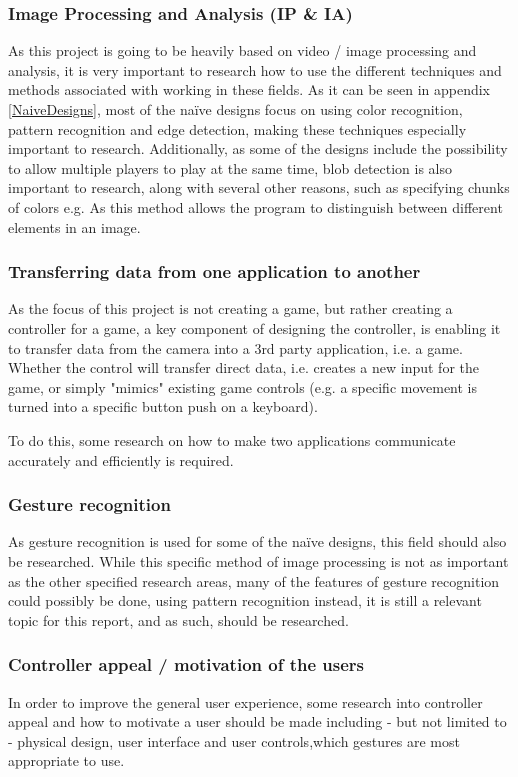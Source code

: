 \subsubsection{Image Processing and Analysis (IP \& IA)}
As this project is going to be heavily based on video / image processing and analysis, it is very important to research how to use the different techniques and methods associated with working in these fields. As it can be seen in appendix \ref{NaiveDesigns}, most of the naïve designs focus on using color recognition, pattern recognition and edge detection, making these techniques especially important to research. Additionally, as some of the designs include the possibility to allow multiple players to play at the same time, blob detection is also important to research, along with several other reasons, such as specifying chunks of colors e.g. As this method allows the program to distinguish between different elements in an image.

\subsubsection{Transferring data from one application to another}
As the focus of this project is not creating a game, but rather creating a controller for a game, a key component of designing the controller, is enabling it to transfer data from the camera into a 3rd party application, i.e. a game. Whether the control will transfer direct data, i.e. creates a new input for the game, or simply "mimics" existing game controls (e.g. a specific movement is turned into a specific button push on a keyboard).

To do this, some research on how to make two applications communicate accurately and efficiently is required.

\subsubsection{Gesture recognition}
As gesture recognition is used for some of the naïve designs, this field should also be researched. While this specific method of image processing is not as important as the other specified research areas, many of the features of gesture recognition could possibly be done, using pattern recognition instead, it is still a relevant topic for this report, and as such, should be researched.

\subsubsection{Controller appeal / motivation of the users}
In order to improve the general user experience, some research into controller appeal and how to motivate a user should be made including - but not limited to - physical design, user interface and user controls,which gestures are most appropriate to use.

